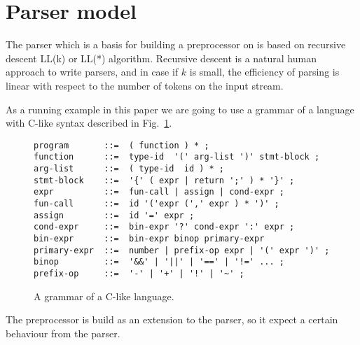 \section{\label{sec:parser}Parser model}

The parser which is a basis for building a preprocessor on is 
based on recursive descent LL(k) or LL(*) algorithm.  Recursive
descent is a natural human approach to write parsers, and in
case if $k$ is small, the efficiency of parsing is linear with
respect to the number of tokens on the input stream. 

As a running example in this paper we are going to use a
grammar of a language with C-like syntax described in
Fig.~\ref{fig:grammar}.

\begin{figure}[h!]
\centering
\begin{verbatim}
program       ::=  ( function ) * ;
function      ::=  type-id  '(' arg-list ')' stmt-block ;
arg-list      ::=  ( type-id  id ) * ;
stmt-block    ::=  '{' ( expr | return ';' ) * '}' ;
expr          ::=  fun-call | assign | cond-expr ;
fun-call      ::=  id '('expr (',' expr ) * ')' ;
assign        ::=  id '=' expr ;
cond-expr     ::=  bin-expr '?' cond-expr ':' expr ;
bin-expr      ::=  bin-expr binop primary-expr
primary-expr  ::=  number | prefix-op expr | '(' expr ')' ;
binop         ::=  '&&' | '||' | '==' | '!=' ... ;
prefix-op     ::=  '-' | '+' | '!' | '~' ;
\end{verbatim}
\caption{\label{fig:grammar}A grammar of a C-like language.}
\end{figure}

The preprocessor is build as an extension to the parser, so
it expect a certain behaviour from the parser.  

